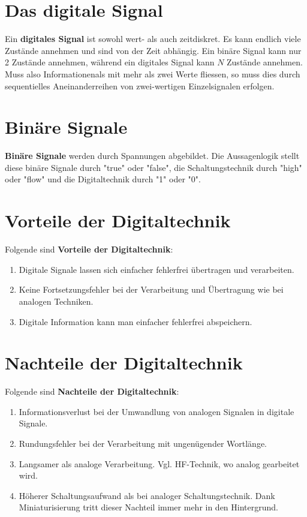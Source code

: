 \section{Das digitale Signal}
Ein {\color{red}\textbf{digitales Signal}} ist sowohl wert- als auch zeitdiskret. Es kann endlich viele Zustände annehmen und sind von der Zeit abhängig. Ein binäre Signal kann nur 2 Zustände annehmen, während ein digitales Signal kann $N$ Zustände annehmen. Muss also Informationenals mit mehr als zwei Werte fliessen, so muss dies durch sequentielles Aneinanderreihen von zwei-wertigen Einzelsignalen erfolgen.
\section{Binäre Signale}
{\color{red}\textbf{Binäre Signale}} werden durch Spannungen abgebildet. Die Aussagenlogik stellt diese binäre Signale durch "true" oder "false", die Schaltungstechnik durch "high" oder "flow" und die Digitaltechnik durch "1" oder "0".
\section{Vorteile der Digitaltechnik}
Folgende sind {\color{red}\textbf{Vorteile der Digitaltechnik}}:
\begin{enumerate}[$(1)$]
\item Digitale Signale lassen sich einfacher fehlerfrei übertragen und verarbeiten.
\item Keine Fortsetzungsfehler bei der Verarbeitung und Übertragung wie bei analogen Techniken.
\item Digitale Information kann man einfacher fehlerfrei abspeichern.
\end{enumerate}
\section{Nachteile der Digitaltechnik}
Folgende sind {\color{red}\textbf{Nachteile der Digitaltechnik}}:
\begin{enumerate}[$(1)$]
\item Informationsverlust bei der Umwandlung von analogen Signalen in digitale Signale.
\item Rundungsfehler bei der Verarbeitung mit ungenügender Wortlänge.
\item Langsamer als analoge Verarbeitung. Vgl. HF-Technik, wo analog gearbeitet wird.
\item Höherer Schaltungsaufwand als bei analoger Schaltungstechnik. Dank Miniaturisierung tritt dieser Nachteil immer mehr in den Hintergrund.
\end{enumerate}
